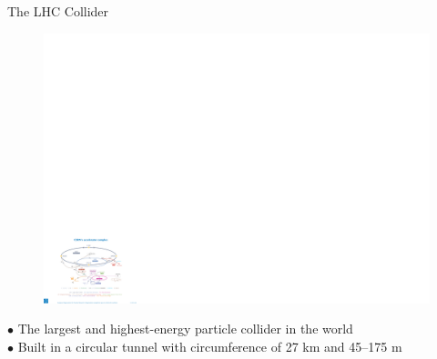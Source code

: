 {%
\begin{frame}[plain]
\end{frame}
}%

{%
\begin{frame}[plain]
\end{frame}
}%

\begin{frame}[fragile]{The LHC Collider}
  \begin{figure}[htpb]
    \centering
    \includegraphics[height=0.75\textheight]{fig/cms/Christiane-1260465__CERN-complex.pdf}
  \end{figure}
  \(\bullet\) The largest and highest-energy particle collider in the world \\
  \(\bullet\) Built in a circular tunnel with circumference of 27 km and 45--175 m 
\end{frame}

